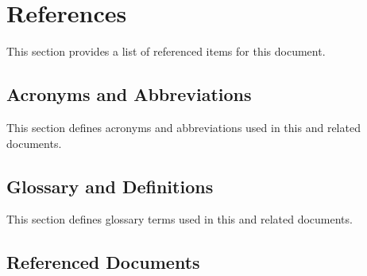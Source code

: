 
\chapter{References}
\label{loc__References}
% 

This section provides a list of referenced items for this document.

\section{Acronyms and Abbreviations}
\label{loc__refs_AcronymsandAbbreviations}
% 

This section defines acronyms and abbreviations used in this and related documents.



\KNEADSECTIONNEWPAGE
\section{Glossary and Definitions}
\label{loc__refs_GlossaryandDefinitions}
% 

This section defines glossary terms used in this and related documents.



\KNEADSECTIONNEWPAGE
\section{Referenced Documents}
\label{loc__Refs_Documents}
% 

\KNEADChapTwoReferences%
